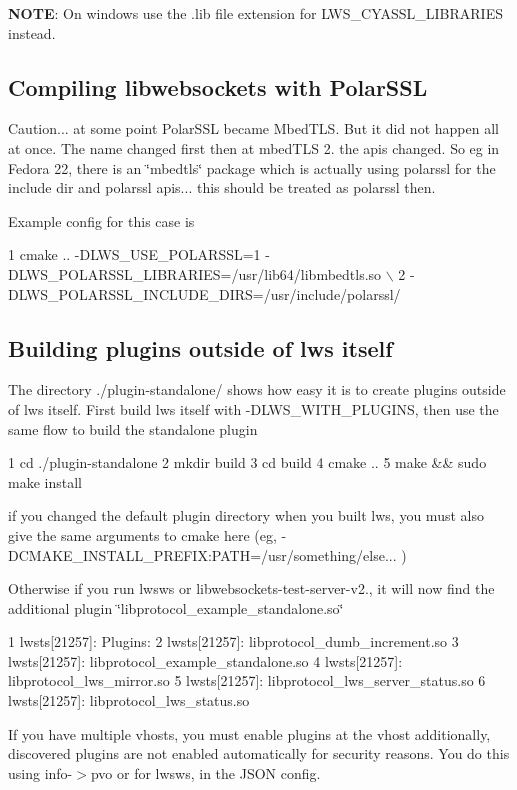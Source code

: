 {\bfseries N\+O\+TE}\+: On windows use the .lib file extension for {\ttfamily L\+W\+S\+\_\+\+C\+Y\+A\+S\+S\+L\+\_\+\+L\+I\+B\+R\+A\+R\+I\+ES} instead.

\subsection*{Compiling libwebsockets with Polar\+S\+SL }

Caution... at some point Polar\+S\+SL became Mbed\+T\+LS. But it did not happen all at once. The name changed first then at mbed\+T\+LS 2. the apis changed. So eg in Fedora 22, there is an \char`\"{}mbedtls\char`\"{} package which is actually using polarssl for the include dir and polarssl apis... this should be treated as polarssl then.

Example config for this case is 
\begin{DoxyCode}
1 cmake .. -DLWS\_USE\_POLARSSL=1 -DLWS\_POLARSSL\_LIBRARIES=/usr/lib64/libmbedtls.so \(\backslash\)
2          -DLWS\_POLARSSL\_INCLUDE\_DIRS=/usr/include/polarssl/
\end{DoxyCode}


\subsection*{Building plugins outside of lws itself }

The directory ./plugin-\/standalone/ shows how easy it is to create plugins outside of lws itself. First build lws itself with -\/\+D\+L\+W\+S\+\_\+\+W\+I\+T\+H\+\_\+\+P\+L\+U\+G\+I\+NS, then use the same flow to build the standalone plugin 
\begin{DoxyCode}
1 cd ./plugin-standalone
2 mkdir build
3 cd build
4 cmake ..
5 make && sudo make install
\end{DoxyCode}


if you changed the default plugin directory when you built lws, you must also give the same arguments to cmake here (eg, {\ttfamily -\/\+D\+C\+M\+A\+K\+E\+\_\+\+I\+N\+S\+T\+A\+L\+L\+\_\+\+P\+R\+E\+F\+IX\+:P\+A\+TH=/usr/something/else...} )

Otherwise if you run lwsws or libwebsockets-\/test-\/server-\/v2., it will now find the additional plugin \char`\"{}libprotocol\+\_\+example\+\_\+standalone.\+so\char`\"{} 
\begin{DoxyCode}
1 lwsts[21257]:   Plugins:
2 lwsts[21257]:    libprotocol\_dumb\_increment.so
3 lwsts[21257]:    libprotocol\_example\_standalone.so
4 lwsts[21257]:    libprotocol\_lws\_mirror.so
5 lwsts[21257]:    libprotocol\_lws\_server\_status.so
6 lwsts[21257]:    libprotocol\_lws\_status.so
\end{DoxyCode}
 If you have multiple vhosts, you must enable plugins at the vhost additionally, discovered plugins are not enabled automatically for security reasons. You do this using info-\/$>$pvo or for lwsws, in the J\+S\+ON config.

